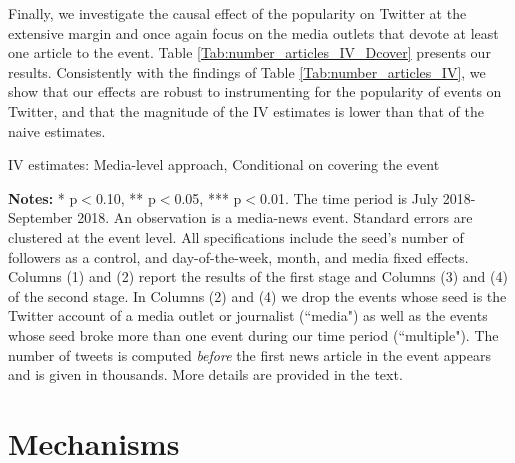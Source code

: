 Finally, we investigate the causal effect of the popularity on Twitter at the extensive margin and once again focus on the media outlets that devote at least one article to the event. Table \ref{Tab:number_articles_IV_Dcover} presents our results. Consistently with the findings of Table \ref{Tab:number_articles_IV}, we show that our effects are robust to instrumenting for the popularity of events on Twitter, and that the magnitude of the IV estimates is lower than that of the naive estimates.


\begin{table}
\caption{IV estimates: Media-level approach, Conditional on covering the event}
\begin{center}
	
\end{center}
\begin{spacing}{0.5}
	{\fns \textbf{Notes:} * p$<$0.10, ** p$<$0.05, *** p$<$0.01. The time period is July 2018-September 2018.  An observation is a media-news event. Standard errors are clustered at the event level. All specifications include the seed's number of followers as a control, and day-of-the-week, month, and media fixed effects. Columns (1) and (2) report the results of the first stage and Columns (3) and (4) of the second stage. In Columns (2) and (4) we drop the events whose seed is the Twitter account of a media outlet or journalist (``media") as well as the events whose seed broke more than one event during our time period (``multiple"). The number of tweets is computed \textit{before} the first news article in the event appears and is given in thousands. More details are provided in the text.}
\end{spacing}
\label{Tab:number_articles_IV_Dcover}
\end{table} 




\section{Mechanisms\label{Sec:Mechanisms}}




